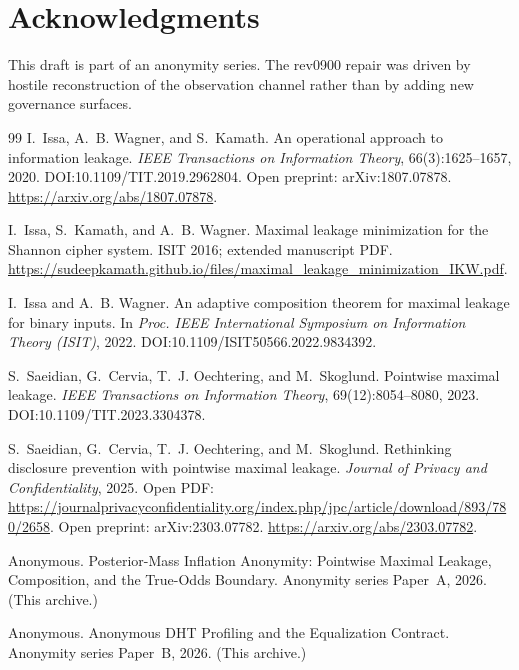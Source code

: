 \documentclass[11pt]{article}
\begin{document}
\section*{Acknowledgments}
This draft is part of an anonymity series. The rev0900 repair was driven by hostile reconstruction of the observation channel rather than by adding new governance surfaces.

\begin{thebibliography}{99}
I.~Issa, A.~B. Wagner, and S.~Kamath.
\newblock An operational approach to information leakage.
\newblock \emph{IEEE Transactions on Information Theory}, 66(3):1625--1657, 2020.
\newblock DOI:10.1109/TIT.2019.2962804.
\newblock Open preprint: arXiv:1807.07878. \url{https://arxiv.org/abs/1807.07878}.

I.~Issa, S.~Kamath, and A.~B. Wagner.
\newblock Maximal leakage minimization for the Shannon cipher system.
\newblock ISIT 2016; extended manuscript PDF. \url{https://sudeepkamath.github.io/files/maximal_leakage_minimization_IKW.pdf}.

I.~Issa and A.~B. Wagner.
\newblock An adaptive composition theorem for maximal leakage for binary inputs.
\newblock In \emph{Proc. IEEE International Symposium on Information Theory (ISIT)}, 2022.
\newblock DOI:10.1109/ISIT50566.2022.9834392.

S.~Saeidian, G.~Cervia, T.~J. Oechtering, and M.~Skoglund.
\newblock Pointwise maximal leakage.
\newblock \emph{IEEE Transactions on Information Theory}, 69(12):8054--8080, 2023.
\newblock DOI:10.1109/TIT.2023.3304378.

S.~Saeidian, G.~Cervia, T.~J. Oechtering, and M.~Skoglund.
\newblock Rethinking disclosure prevention with pointwise maximal leakage.
\newblock \emph{Journal of Privacy and Confidentiality}, 2025.
\newblock Open PDF: \url{https://journalprivacyconfidentiality.org/index.php/jpc/article/download/893/780/2658}.
\newblock Open preprint: arXiv:2303.07782. \url{https://arxiv.org/abs/2303.07782}.

Anonymous.
\newblock Posterior-Mass Inflation Anonymity: Pointwise Maximal Leakage, Composition, and the True-Odds Boundary.
\newblock Anonymity series Paper~A, 2026. (This archive.)

Anonymous.
\newblock Anonymous DHT Profiling and the Equalization Contract.
\newblock Anonymity series Paper~B, 2026. (This archive.)


\end{thebibliography}
\end{document}
